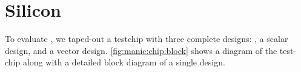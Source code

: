 \figMANICChipBlock

\section{\manic Silicon}
\label{manic:silicon}
To evaluate \manic, we taped-out a testchip with three complete designs: \manic, a scalar design, and a vector design.
% 
\autoref{fig:manic:chip:block} shows a diagram of the test-chip along with a detailed block diagram of a single design.
% 

\figMANICChip
\tabMANICEval
\figMANICEnergyCache
\figMANICEnergyNoCache
\figMANICMRAMCase